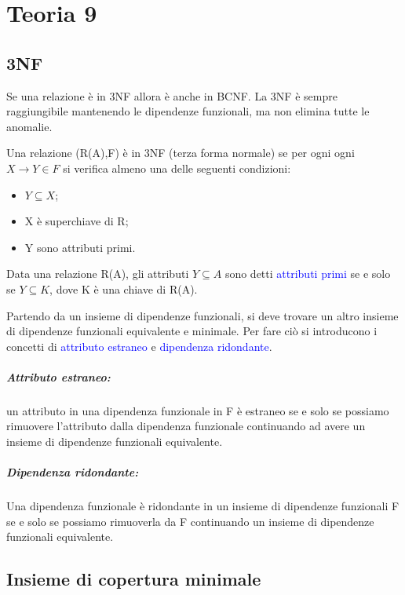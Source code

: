 \chapter{Teoria 9}

\section{3NF}

Se una relazione è in 3NF allora è anche in BCNF. La 3NF è sempre raggiungibile mantenendo le dipendenze funzionali, ma non elimina tutte le anomalie.

Una relazione (R(A),F) è in 3NF (terza forma normale) se per ogni ogni $X \rightarrow Y \in F$ si verifica almeno una delle
seguenti condizioni:

\begin{itemize}
    \item $Y \subseteq X$;
    \item X è superchiave di R;
    \item Y sono attributi primi.
\end{itemize}

Data una relazione R(A), gli attributi $Y \subseteq A$ sono detti \textcolor{blue}{attributi primi} se e solo se $Y \subseteq K$, dove K è una chiave di R(A).

Partendo da un insieme di dipendenze funzionali, si deve trovare un altro insieme di dipendenze funzionali equivalente e minimale. Per fare ciò si introducono i concetti di \textcolor{blue}{attributo estraneo} e \textcolor{blue}{dipendenza ridondante}.

\paragraph{Attributo estraneo:} un attributo in una dipendenza funzionale in F è estraneo se e solo se possiamo rimuovere l’attributo dalla dipendenza funzionale continuando ad avere un insieme di dipendenze funzionali equivalente.

\paragraph{Dipendenza ridondante:} Una dipendenza funzionale è ridondante in un insieme di dipendenze funzionali F se e solo se possiamo rimuoverla da F continuando un insieme di dipendenze funzionali equivalente.

\section{Insieme di copertura minimale}

